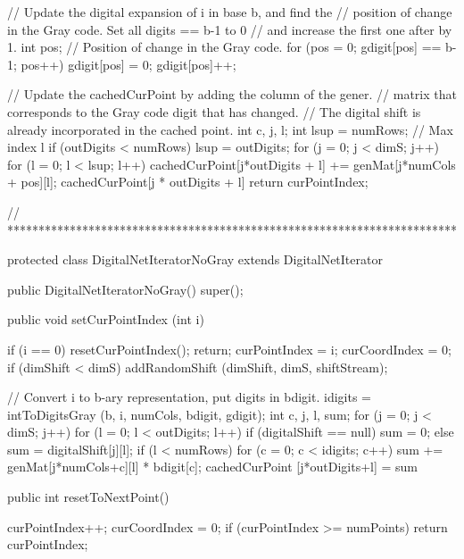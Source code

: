 \begin{code}
\begin{hide}
{{         // Update the digital expansion of i in base b, and find the
         // position of change in the Gray code. Set all digits == b-1 to 0
         // and increase the first one after by 1.
         int pos;      // Position of change in the Gray code.
         for (pos = 0; gdigit[pos] == b-1; pos++)
            gdigit[pos] = 0;
         gdigit[pos]++;

         // Update the cachedCurPoint by adding the column of the gener.
         // matrix that corresponds to the Gray code digit that has changed.
         // The digital shift is already incorporated in the cached point.
         int c, j, l;
         int lsup = numRows;        // Max index l
         if (outDigits < numRows)
            lsup = outDigits;
         for (j = 0; j < dimS; j++) {
            for (l = 0; l < lsup; l++) {
               cachedCurPoint[j*outDigits + l] += genMat[j*numCols + pos][l];
               cachedCurPoint[j * outDigits + l] %
            }
         }
         return curPointIndex;
      }
   }


// ************************************************************************

   protected class DigitalNetIteratorNoGray extends DigitalNetIterator {

      public DigitalNetIteratorNoGray() {
         super();
      }

      public void setCurPointIndex (int i) {
         if (i == 0) {
            resetCurPointIndex();
            return;
         }
         curPointIndex = i;
         curCoordIndex = 0;
         if (dimShift < dimS)
             addRandomShift (dimShift, dimS, shiftStream);

         // Convert i to b-ary representation, put digits in bdigit.
         idigits = intToDigitsGray (b, i, numCols, bdigit, gdigit);
         int c, j, l, sum;
         for (j = 0; j < dimS; j++) {
            for (l = 0; l < outDigits; l++) {
               if (digitalShift == null)
                  sum = 0;
               else
                  sum = digitalShift[j][l];
               if (l < numRows)
                  for (c = 0; c < idigits; c++)
                     sum += genMat[j*numCols+c][l] * bdigit[c];
               cachedCurPoint [j*outDigits+l] = sum %
            }
         }
      }

      public int resetToNextPoint() {
         curPointIndex++;
         curCoordIndex = 0;
         if (curPointIndex >= numPoints)
            return curPointIndex;

}}
\end{hide}
\end{code}
